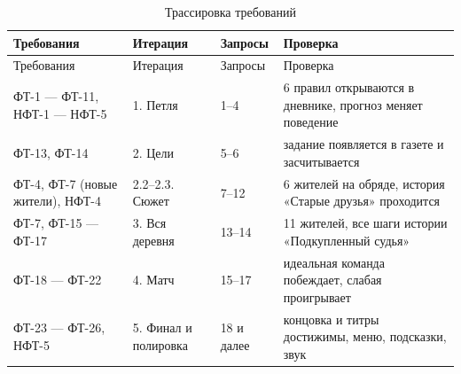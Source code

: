 \documentclass[12pt]{article}
\begin{document}
{\small\singlespacing
\begin{longtable}{|p{30mm}|p{40mm}|p{24mm}|p{56mm}|}
\caption{Трассировка требований}\label{tab:trace}\\\hline
Требования & Итерация & Запросы & Проверка\\\hline\endfirsthead
\hline Требования & Итерация & Запросы & Проверка\\\hline\endhead
ФТ-1 — ФТ-11, НФТ-1 — НФТ-5 & 1. Петля & 1–4 & 6 правил открываются в дневнике, прогноз меняет поведение\\\hline
ФТ-13, ФТ-14 & 2. Цели & 5–6 & задание появляется в газете и засчитывается\\\hline
ФТ-4, ФТ-7 (новые жители), НФТ-4 & 2.2–2.3. Сюжет & 7–12 & 6 жителей на обряде, история «Старые друзья» проходится\\\hline
ФТ-7, ФТ-15 — ФТ-17 & 3. Вся деревня & 13–14 & 11 жителей, все шаги истории «Подкупленный судья»\\\hline
ФТ-18 — ФТ-22 & 4. Матч & 15–17 & идеальная команда побеждает, слабая проигрывает\\\hline
ФТ-23 — ФТ-26, НФТ-5 & 5. Финал и полировка & 18 и далее & концовка и титры достижимы, меню, подсказки, звук\\\hline
\end{longtable}}

\changelist
\end{document}
